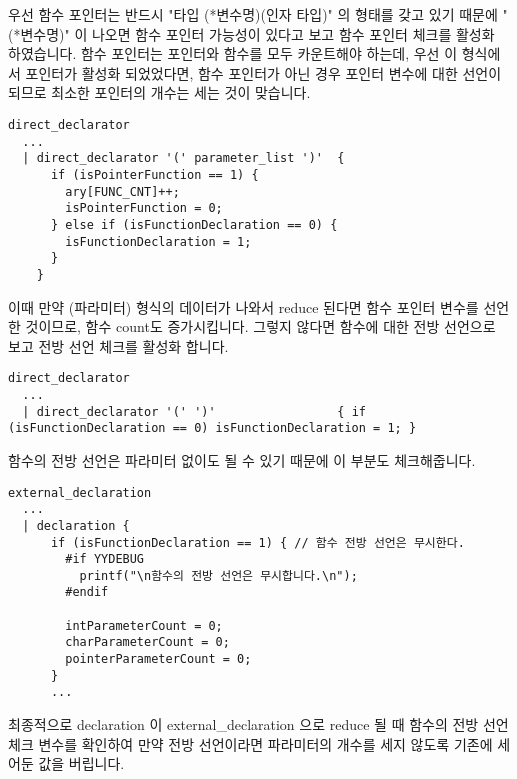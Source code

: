 \documentclass{article}
\begin{document}
우선 함수 포인터는 반드시 "타입 (*변수명)(인자 타입)" 의 형태를 갖고 있기 때문에 "(*변수명)" 이 나오면 함수 포인터 가능성이 있다고 보고 함수 포인터 체크를 활성화 하였습니다. 함수 포인터는 포인터와 함수를 모두 카운트해야 하는데, 우선 이 형식에서 포인터가 활성화 되었었다면, 함수 포인터가 아닌 경우 포인터 변수에 대한 선언이 되므로 최소한 포인터의 개수는 세는 것이 맞습니다.
\begin{verbatim}
direct_declarator
  ...
  | direct_declarator '(' parameter_list ')'  {
      if (isPointerFunction == 1) {
        ary[FUNC_CNT]++;
        isPointerFunction = 0;
      } else if (isFunctionDeclaration == 0) {
        isFunctionDeclaration = 1;
      }
    }
\end{verbatim}
이때 만약 (파라미터) 형식의 데이터가 나와서 reduce 된다면 함수 포인터 변수를 선언한 것이므로, 함수 count도 증가시킵니다. 그렇지 않다면 함수에 대한 전방 선언으로 보고 전방 선언 체크를 활성화 합니다.
\begin{verbatim}
direct_declarator
  ...
  | direct_declarator '(' ')'                 { if (isFunctionDeclaration == 0) isFunctionDeclaration = 1; }
\end{verbatim}
함수의 전방 선언은 파라미터 없이도 될 수 있기 때문에 이 부분도 체크해줍니다.
\begin{verbatim}
external_declaration
  ...
  | declaration {
      if (isFunctionDeclaration == 1) { // 함수 전방 선언은 무시한다.
        #if YYDEBUG
          printf("\n함수의 전방 선언은 무시합니다.\n");
        #endif
        
        intParameterCount = 0;
        charParameterCount = 0;
        pointerParameterCount = 0;
      }
      ...
\end{verbatim}
최종적으로 declaration 이 external\_declaration 으로 reduce 될 때 함수의 전방 선언 체크 변수를 확인하여 만약 전방 선언이라면 파라미터의 개수를 세지 않도록 기존에 세어둔 값을 버립니다.
\end{document}
